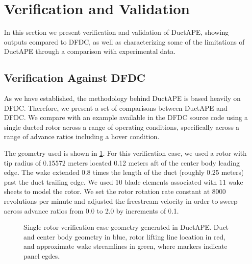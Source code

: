 \section{Verification and Validation}
\label{sec:vv}

In this section we present verification and validation of DuctAPE, showing outputs compared to DFDC, as well as characterizing some of the limitations of DuctAPE through a comparison with experimental data.

\subsection{Verification Against DFDC}
\label{ssec:verification}

As we have established, the methodology behind DuctAPE is based heavily on DFDC.
%
Therefore, we present a set of comparisons between DuctAPE and DFDC.
%
We compare with an example available in the DFDC source code using a single ducted rotor across a range of operating conditions, specifically across a range of advance ratios including a hover condition.

The geometry used is shown in \cref{fig:singlerotorgeom}.
%
%
For this verification case, we used a rotor with tip radius of 0.15572 meters located 0.12 meters aft of the center body leading edge.
%
The wake extended 0.8 times the length of the duct (roughly 0.25 meters) past the duct trailing edge.
%
We used 10 blade elements associated with 11 wake sheets to model the rotor.
%
We set the rotor rotation rate constant at 8000 revolutions per minute and adjusted the freestream velocity in order to sweep across advance ratios from 0.0 to 2.0 by increments of 0.1.
%
\begin{figure}[h!]
     \centering
     \caption[DuctAPE verification geometry.]{Single rotor verification case geometry generated in DuctAPE. Duct and center body geometry in blue, rotor lifting line location in red, and approximate wake streamlines in green, where markers indicate panel egdes.}
    \label{fig:singlerotorgeom}
\end{figure}

